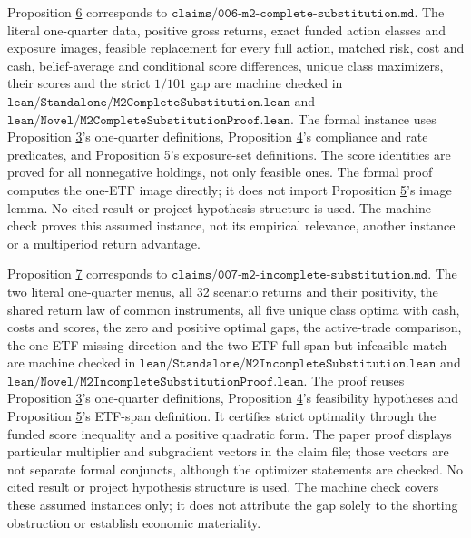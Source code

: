 \documentclass[11pt]{article}
\begin{document}
Proposition \hyperref[res:Proposition-6]{6} corresponds to
\(\texttt{claims/006-m2-complete-substitution.md}\). The literal one-quarter data,
positive gross returns, exact funded action classes and exposure images,
feasible replacement for every full action, matched risk, cost and cash,
belief-average and conditional score differences, unique class maximizers,
their scores and the strict \(1/101\) gap are machine checked in
\(\texttt{lean/Standalone/M2CompleteSubstitution.lean}\) and
\(\texttt{lean/Novel/M2CompleteSubstitutionProof.lean}\). The formal instance
uses Proposition \hyperref[res:Proposition-3]{3}'s one-quarter definitions, Proposition \hyperref[res:Proposition-4]{4}'s compliance and rate
predicates, and Proposition \hyperref[res:Proposition-5]{5}'s exposure-set definitions. The score identities
are proved for all nonnegative holdings, not only feasible ones. The formal
proof computes the one-ETF image directly; it does not import Proposition \hyperref[res:Proposition-5]{5}'s
image lemma. No cited result or project hypothesis structure is used. The
machine check proves this assumed instance, not its empirical relevance,
another instance or a multiperiod return advantage.

Proposition \hyperref[res:Proposition-7]{7} corresponds to
\(\texttt{claims/007-m2-incomplete-substitution.md}\). The two literal
one-quarter menus, all 32 scenario returns and their positivity, the shared return
law of common instruments, all five unique class optima with cash, costs
and scores, the zero and positive optimal gaps, the active-trade comparison,
the one-ETF missing direction and the two-ETF full-span but infeasible
match are machine checked in
\(\texttt{lean/Standalone/M2IncompleteSubstitution.lean}\) and
\(\texttt{lean/Novel/M2IncompleteSubstitutionProof.lean}\). The proof
reuses Proposition \hyperref[res:Proposition-3]{3}'s one-quarter definitions, Proposition \hyperref[res:Proposition-4]{4}'s feasibility
hypotheses and Proposition \hyperref[res:Proposition-5]{5}'s ETF-span definition. It certifies strict
optimality through the funded score inequality and a positive quadratic
form. The paper proof displays particular multiplier and subgradient
vectors in the claim file; those vectors are not separate formal
conjuncts, although the optimizer statements are checked. No cited
result or project hypothesis structure is used. The machine check covers
these assumed instances only; it does not attribute the gap solely to
the shorting obstruction or establish economic materiality.
\end{document}
